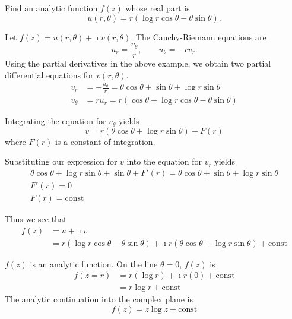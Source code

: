 \begin{Example}
  Find an analytic function $f(z)$ whose real part is
  \[
  u(r,\theta) =  r \left( \log r \cos \theta - \theta \sin \theta \right).
  \]

  Let $f(z) = u(r,\theta) + \imath v(r,\theta)$.
  The Cauchy-Riemann equations are
  \[
  u_r = \frac{v_\theta}{r}, \qquad u_\theta = -r v_r.
  \]
  Using the partial derivatives in the above example, we obtain two partial
  differential equations for $v(r, \theta)$.
  \begin{align*}
    v_r &= -\frac{u_\theta}{r} = \theta \cos \theta + \sin \theta + \log r \sin \theta  
    \\
    v_\theta &= r u_r = r \left( \cos \theta + \log r \cos \theta - \theta \sin \theta \right)
  \end{align*}

  Integrating the equation for $v_\theta$ yields
  \[
  v = r \left( \theta \cos \theta + \log r \sin \theta \right) + F(r)
  \]
  where $F(r)$ is a constant of integration.

  Substituting our expression for $v$ into the equation for $v_r$ yields
  \begin{gather*}
    \theta \cos \theta + \log r \sin \theta + \sin \theta + F'(r) =
    \theta \cos \theta + \sin \theta + \log r \sin \theta 
    \\
    F'(r) = 0 \\
    F(r) = \mathrm{const}
  \end{gather*}

  Thus we see that
  \begin{align*}
    f(z)
    &= u + \imath v 
    \\
    &= r \left( \log r \cos \theta - \theta \sin \theta \right)
    + \imath r \left( \theta \cos \theta + \log r \sin \theta \right)
    + \mathrm{const}
  \end{align*}

  $f(z)$ is an analytic function. On the line $\theta = 0$, $f(z)$ is
  \begin{align*}
    f(z = r) &= r ( \log r ) + \imath r ( 0 ) + \mathrm{const} 
    \\
    &= r \log r + \mathrm{const}
  \end{align*}
  The analytic continuation into the complex plane is
  \[
  \boxed{ 
    f(z) = z \log z + \mathrm{const} 
    }
  \]
\end{Example}







